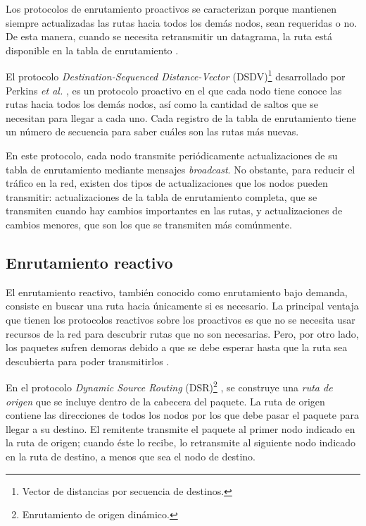 \label{subsec:enrutamiento_proactivo}

Los protocolos de enrutamiento proactivos se caracterizan porque mantienen
siempre actualizadas las rutas hacia todos los demás nodos, sean requeridas o
no. De esta manera, cuando se necesita retransmitir un datagrama, la ruta está
disponible en la tabla de enrutamiento \cite{Wenden2005}.

El protocolo \textit{Destination-Sequenced Distance-Vector}
(DSDV)\footnote{Vector de distancias por secuencia de destinos.} desarrollado
por Perkins \textit{et al.} \cite{Perkins1994}, es un protocolo proactivo en el
que cada nodo tiene conoce las rutas hacia todos los demás nodos, así como la
cantidad de saltos que se necesitan para llegar a cada uno. Cada registro de la
tabla de enrutamiento tiene un número de secuencia para saber cuáles son las
rutas más nuevas.

En este protocolo, cada nodo transmite periódicamente actualizaciones de su
tabla de enrutamiento mediante mensajes \textit{broadcast}. No obstante, para
reducir el tráfico en la red, existen dos tipos de actualizaciones que los
nodos pueden transmitir: actualizaciones de la tabla de enrutamiento completa,
que se transmiten cuando hay cambios importantes en las rutas, y actualizaciones
de cambios menores, que son los que se transmiten más comúnmente.

\subsection{Enrutamiento reactivo}

\label{subsec:enrutamiento_reactivo}

El enrutamiento reactivo, también conocido como enrutamiento bajo demanda,
consiste en buscar una ruta hacia únicamente si es necesario. La principal
ventaja que tienen los protocolos reactivos sobre los proactivos es que no se
necesita usar recursos de la red para descubrir rutas que no son necesarias.
Pero, por otro lado, los paquetes sufren demoras debido a que se debe esperar
hasta que la ruta sea descubierta para poder transmitirlos \cite{Wenden2005}.

En el protocolo \textit{Dynamic Source Routing} (DSR)\footnote{Enrutamiento de
origen dinámico.} \cite{Johnson1996}, se construye una \textit{ruta de origen}
que se incluye dentro de la cabecera del paquete. La ruta de origen contiene
las direcciones de todos los nodos por los que debe pasar el paquete para llegar
a su destino. El remitente transmite el paquete al primer nodo indicado en la
ruta de origen; cuando éste lo recibe, lo retransmite al siguiente nodo
indicado en la ruta de destino, a menos que sea el nodo de destino.

